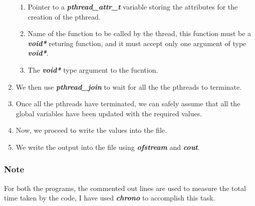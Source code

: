 \documentclass[a4paper,12pt]{report}
\begin{document}
\begin{enumerate}
\begin{enumerate}
\item Pointer to a \textit{\textbf{pthread\_attr\_t}} variable storing the attributes for the creation of the pthread.
\item Name of the function to be called by the thread, this function must be a \textbf{\textit{void*}} returing function, and it must accept only one argument of type \textit{\textbf{void*}}.
\item The \textit{\textbf{void*}} type argument to the fucntion.
\end{enumerate}
\item We then use \textit{\textbf{pthread\_join}} to wait for all the the pthreads to terminate.
\item Once all the pthreads have terminated, we can safely assume that all the global variables have been updated with the required values.
\item Now, we proceed to write the values into the file.
\item We write the output into the file using \textit{\textbf{ofstream}} and \textbf{\textit{cout}}.
\end{enumerate}
\subsubsection*{Note}
For both the programs, the commented out lines are used to measure the total time taken by the code, I have used \textit{\textbf{chrono}} to accomplish this task.
\newpage
\end{document}
